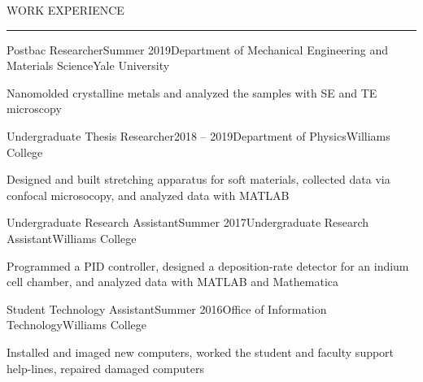 \documentclass{short_resume} %
\renewenvironment{rSection}[1]{
	\sectionskip
	\textcolor{RoyalPurple}{\MakeUppercase{#1}}
	\sectionlineskip
	\hrule
	\begin{list}{}{
			\setlength{\leftmargin}{1.5em}
		}
		\item[]
	}{
	\end{list}
}
\begin{document}
	\begin{rSection}{Work Experience}
		\begin{rSubsection}{Postbac Researcher}{Summer 2019}{Department of Mechanical Engineering and Materials Science}{Yale University}
			\item[] Nanomolded crystalline metals and analyzed the samples with SE and TE microscopy
		\end{rSubsection}
		
		\begin{rSubsection}{Undergraduate Thesis Researcher}{2018 -- 2019}{Department of Physics}{Williams College}
			\item[] Designed and built stretching apparatus for soft materials, collected data via confocal microsocopy, and analyzed data with MATLAB
		\end{rSubsection}
		
		\begin{rSubsection}{Undergraduate Research Assistant}{Summer 2017}{Undergraduate Research Assistant}{Williams College}
			\item[] Programmed a PID controller, designed a deposition-rate detector for an indium cell chamber, and analyzed data with MATLAB and Mathematica
		\end{rSubsection}
	
		\begin{rSubsection}{Student Technology Assistant}{Summer 2016}{Office of Information Technology}{Williams College}
		\item[] Installed and imaged new computers, worked the student and faculty support help-lines, repaired damaged computers
		\end{rSubsection}
	
	\end{rSection}
	
\end{document}
